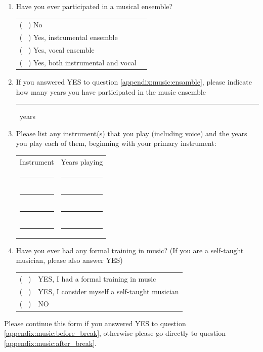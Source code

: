 \documentclass[a4paper,11pt]{article}
\newcommand{\myunderline}{\rule{2in}{.5pt}}
\begin{document}
{\begin{appendices}
\begin{enumerate}[resume]
	\myunderline

	\item \label{appendix:music:ensamble}Have you ever participated in a musical ensemble?

	\begin{tabular}{l l}
		( \ ) No \\
		( \ ) Yes, instrumental ensemble \\
		( \ ) Yes, vocal ensemble \\
		( \ ) Yes, both instrumental and vocal \\
	\end{tabular}

	\item If you answered YES to question \ref{appendix:music:ensamble}, please indicate how many years you have participated in the music ensemble

	\myunderline \ years

	\item Please list any instrument(s) that you play (including voice) and the years you play each of them, beginning with your primary instrument:

	\begin{tabular}{c c}
		Instrument &  Years playing \\
		\myunderline & \myunderline \\
		\myunderline & \myunderline \\
		\myunderline & \myunderline \\
		\myunderline & \myunderline \\
	\end{tabular}
	
	\item \label{appendix:music:before_break}Have you ever had any formal training in music? (If you are a self-taught musician, please also answer YES)

	\begin{tabular}{l l}
		( \ ) & YES, I had a formal training in music \\
		( \ ) & YES, I consider myself a self-taught musician \\
		( \ ) & NO \\
	\end{tabular}

\end{enumerate}
Please continue this form if you answered YES to question \ref{appendix:music:before_break}, otherwise please go directly to question \ref{appendix:music:after_break}.
\begin{enumerate}[resume]


\end{enumerate}
\end{appendices}}
\end{document}
